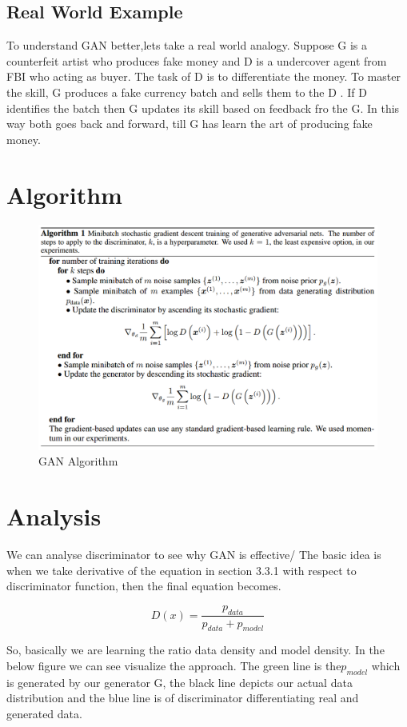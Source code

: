 \subsection{Real World Example}
To understand GAN better,lets take a real world analogy. Suppose G is a counterfeit artist who produces fake money and D is a undercover agent from FBI who acting as buyer. The task of D is to differentiate the money. To master the skill, G produces a fake currency batch and sells them to the D . If D identifies the batch then G updates its skill based on feedback fro the G. In this way  both goes back and forward, till G has learn the art of producing fake money.
\section{Algorithm}

\begin{figure}[t]

  \centering
    \includegraphics[scale=.4, angle=0]{Files/Algorithm.png}
    \caption[Vanilla GAN Algorithm]{ GAN Algorithm\cite{Gan-overview}}
    \label{fig: GAN Algorithm}
\end{figure}

\section{Analysis}

We can analyse discriminator to see why GAN is effective/ The basic idea is when we take derivative of the equation in section 3.3.1 with respect to discriminator function, then the final equation becomes.

$$ D(x) =\frac{p_{data}}{p_{data} + p_{model}}$$

So, basically we are learning the ratio data density  and model density. In the below figure we can see visualize the approach. The green  line is the$p_{model}$ which is generated by our generator G, the black line depicts our actual data distribution and the blue line is of discriminator differentiating real and generated data.
